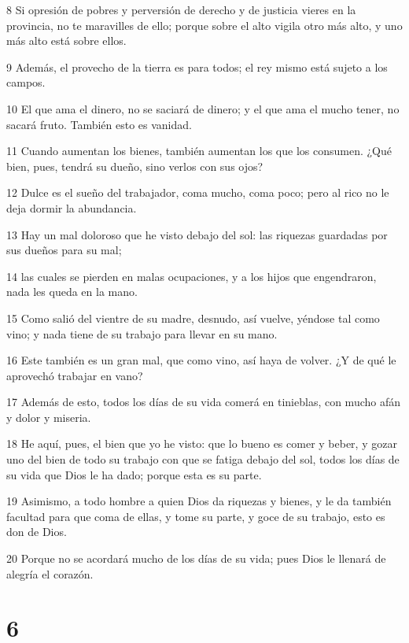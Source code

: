 \par 8 Si opresión de pobres y perversión de derecho y de justicia vieres en la provincia, no te maravilles de ello; porque sobre el alto vigila otro más alto, y uno más alto está sobre ellos.
\par 9 Además, el provecho de la tierra es para todos; el rey mismo está sujeto a los campos.
\par 10 El que ama el dinero, no se saciará de dinero; y el que ama el mucho tener, no sacará fruto. También esto es vanidad.
\par 11 Cuando aumentan los bienes, también aumentan los que los consumen. ¿Qué bien, pues, tendrá su dueño, sino verlos con sus ojos?
\par 12 Dulce es el sueño del trabajador, coma mucho, coma poco; pero al rico no le deja dormir la abundancia.
\par 13 Hay un mal doloroso que he visto debajo del sol: las riquezas guardadas por sus dueños para su mal;
\par 14 las cuales se pierden en malas ocupaciones, y a los hijos que engendraron, nada les queda en la mano.
\par 15 Como salió del vientre de su madre, desnudo, así vuelve, yéndose tal como vino; y nada tiene de su trabajo para llevar en su mano.
\par 16 Este también es un gran mal, que como vino, así haya de volver. ¿Y de qué le aprovechó trabajar en vano?
\par 17 Además de esto, todos los días de su vida comerá en tinieblas, con mucho afán y dolor y miseria.
\par 18 He aquí, pues, el bien que yo he visto: que lo bueno es comer y beber, y gozar uno del bien de todo su trabajo con que se fatiga debajo del sol, todos los días de su vida que Dios le ha dado; porque esta es su parte.
\par 19 Asimismo, a todo hombre a quien Dios da riquezas y bienes, y le da también facultad para que coma de ellas, y tome su parte, y goce de su trabajo, esto es don de Dios.
\par 20 Porque no se acordará mucho de los días de su vida; pues Dios le llenará de alegría el corazón.

\chapter{6}

